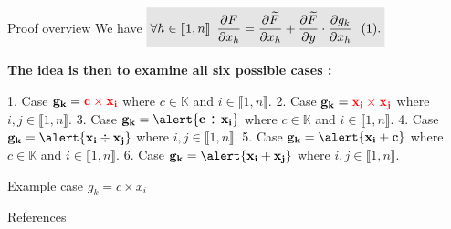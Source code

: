 \begin{frame}{Proof overview}
    We have 
    $\colbox{\forall h \in \llbracket 1,n \rrbracket \,\,\, \pd{F}{x_h} = \pd{\widetilde{F}}{x_h} + \pd{\widetilde{F}}{y}\cdot\pd{g_k}{x_h}\ \ (1).
    }
    $

\vskip 0.5cm
\textbf{The idea is then to examine all six possible cases :}
\vskip 0.3cm

1. Case $\mathbf{g_k = \textcolor{red}{c \times x_i}}$ where $c \in \mathbb{K}$ and $i \in \llbracket 1,n \rrbracket$.
\vskip 0.1cm
2. Case $\mathbf{g_k = \textcolor{red}{x_i \times x_j}}$ where $i,j \in \llbracket 1,n \rrbracket$.
\vskip 0.1cm
3. Case $\mathbf{g_k = \alert{c \div x_i}}$ where $c \in \mathbb{K}$ and $i \in \llbracket 1,n \rrbracket$.
\vskip 0.1cm
4. Case $\mathbf{g_k = \alert{x_i \div x_j}}$ where $i,j \in \llbracket 1,n \rrbracket$.
\vskip 0.1cm
5. Case $\mathbf{g_k = \alert{x_i+c}}$ where $c \in \mathbb{K}$ and $i \in \llbracket 1,n \rrbracket$.
\vskip 0.1cm
6. Case $\mathbf{g_k = \alert{x_i+x_j}}$ where $i,j \in \llbracket 1,n \rrbracket$.

\end{frame}

\begin{frame}{Example case $g_k = c \times x_i$}
\end{frame}


\begin{frame}{References}
\end{frame}



